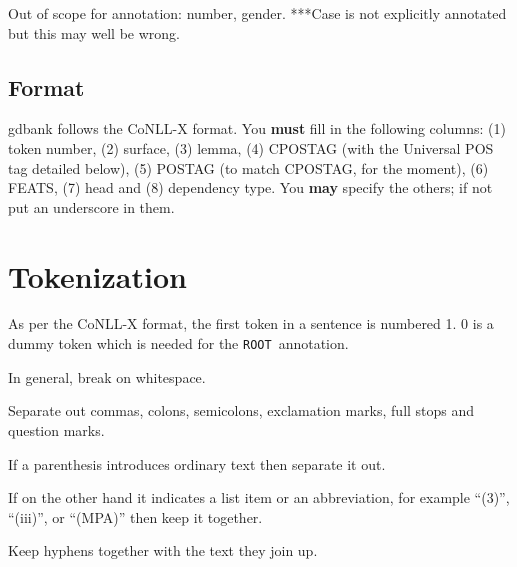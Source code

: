 \documentclass[a4paper]{article}
\begin{document}
 Out of scope for annotation: number, gender.
***Case is not explicitly annotated but this may well be wrong.

\subsection{Format}

 gdbank follows the CoNLL-X format.
You \textbf{must} fill in the following columns: (1) token number, (2) surface, (3) lemma, (4) CPOSTAG (with the Universal POS tag detailed below), (5) POSTAG (to match CPOSTAG, for the moment), (6) FEATS, (7) head and (8) dependency type.
You \textbf{may} specify the others; if not put an underscore in them.

\section{Tokenization}

\newcommand{\ADV}{\texttt{ADV}}
\newcommand{\NOUN}{\texttt{NOUN}}
\newcommand{\PRT}{\texttt{PRT}}
\newcommand{\ROOT}{\texttt{ROOT}}
\newcommand{\VERB}{\texttt{VERB}}
\newcommand{\deter}{\texttt{det}}
\newcommand{\adpmod}{\texttt{adpmod}}
\newcommand{\adpobj}{\texttt{adpobj}}
\newcommand{\advmod}{\texttt{advmod}}
\newcommand{\appos}{\texttt{appos}}
\newcommand{\cc}{\texttt{cc}}
\newcommand{\ccomp}{\texttt{ccomp}}
\newcommand{\conj}{\texttt{conj}}
\newcommand{\dobj}{\texttt{dobj}}
\newcommand{\marker}{\texttt{mark}}
\newcommand{\nmod}{\texttt{nmod}}
\newcommand{\nsubj}{\texttt{nsubj}}
\newcommand{\p}{\texttt{p}}
\newcommand{\prt}{\texttt{prt}}
\newcommand{\rcmod}{\texttt{rcmod}}
\newcommand{\rel}{\texttt{rel}}

 As per the CoNLL-X format, the first token in a sentence is numbered 1. 
0 is a dummy token which is needed for the \ROOT\ annotation.

 In general, break on whitespace.

 Separate out commas, colons, semicolons, exclamation marks, full stops and question marks.

 If a parenthesis introduces ordinary text then separate it out.

 If on the other hand it indicates a list item or an abbreviation, for example ``(3)'', ``(iii)'', or ``(MPA)'' then keep it together.

 Keep hyphens together with the text they join up.
\end{document}
